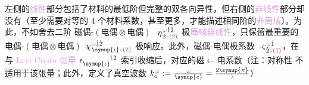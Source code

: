  左侧的\textcolor{Plum}{线性}部分包括了材料的最低阶但完整的\textcolor{PineGreen}{双各向异性}\cite{langeMultipoleTheoryHehl2015}，但右侧的\textcolor{Plum}{非线性}部分却没有（至少需要对等的 4 个材料系数，甚至更多，才能描述相同阶的\textcolor{Plum}{非局域}）。为此，不如舍去二阶 \textcolor{NavyBlue}{磁偶-$(\text{电偶}\otimes\text{电偶})$} $\Xint{\begin{smallmatrix} ~ \\ {}^{}_{\mathcolor{gray}{-}} \\ ~ \end{smallmatrix}}{17}{\eta}^{\;\! \mathcolor{gray}{\omega} \hat{1} \hat{2}}_{\;\! \dot{2} \mathcolor{gray}{z} \textcolor{Maroon}{(2)}}$ 极\textcolor{Plum}{局域}\textcolor{Plum}{非线性}，只保留最重要的\textcolor{NavyBlue}{电偶-$(\text{电偶}\otimes\text{电偶})$} $\Xint{{}^{}_{\mathcolor{gray}{-}}}{23}{\chi}^{\;\! \mathcolor{gray}{\omega} \hat{1} \hat{2}}_{\;\! \symup{\iota} \mathcolor{gray}{z} \textcolor{Maroon}{(2)}}$ 极响应。此外，\textcolor{NavyBlue}{磁偶-电偶}极系数 $\Xint{\begin{smallmatrix} ~ \\ {}^{}_{\mathcolor{gray}{-}} \\ ~ \end{smallmatrix}}{13}{\varsigma}^{\;\! \mathcolor{gray}{\omega} \hat{1}}_{\;\! \dot{2} \mathcolor{gray}{z} \textcolor{Maroon}{(1)}}$，在与 \textcolor{Plum}{Levi-Civita 张量} $\epsilon^{\hphantom{\symup{\iota}}\mathcolor{gray}{\dot{1}}\dot{2}}_{\symup{\iota}}$ 索引收缩后，对应的\textcolor{NavyBlue}{磁$\longleftarrow$电}系数（注：对称性  不适用于该张量；此外，定义了\textcolor{PineGreen}{真空波数} $k_{\textcolor{Maroon}{\mathsf{o}}}^{\;\! \mathcolor{gray}{\omega}} := \frac{\mathcolor{gray}{\omega}}{\symup{c}} = \frac{2 \symup{\pi}}{\mathcolor{gray}{\lambda}}$）
